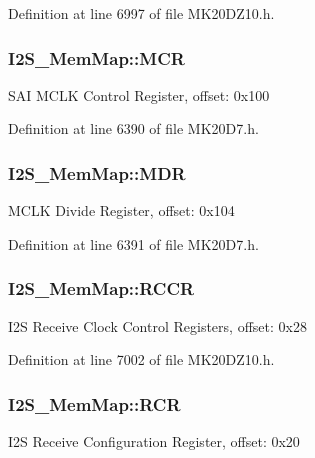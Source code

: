Definition at line 6997 of file M\+K20\+D\+Z10.\+h.

\subsubsection[{\texorpdfstring{M\+CR}{MCR}}]{ I2\+S\+\_\+\+Mem\+Map\+::\+M\+CR}\hypertarget{struct_i2_s___mem_map_ae0d902ef484de4b08fb15ac3bb335cc4}{}\label{struct_i2_s___mem_map_ae0d902ef484de4b08fb15ac3bb335cc4}
S\+AI M\+C\+LK Control Register, offset\+: 0x100 

Definition at line 6390 of file M\+K20\+D7.\+h.

\subsubsection[{\texorpdfstring{M\+DR}{MDR}}]{ I2\+S\+\_\+\+Mem\+Map\+::\+M\+DR}\hypertarget{struct_i2_s___mem_map_a2c12ce85b2f95cc5f4f4cb594e1df7e0}{}\label{struct_i2_s___mem_map_a2c12ce85b2f95cc5f4f4cb594e1df7e0}
M\+C\+LK Divide Register, offset\+: 0x104 

Definition at line 6391 of file M\+K20\+D7.\+h.

\subsubsection[{\texorpdfstring{R\+C\+CR}{RCCR}}]{ I2\+S\+\_\+\+Mem\+Map\+::\+R\+C\+CR}\hypertarget{struct_i2_s___mem_map_a0c4dddedd7f4d71d5bb3d67ec39e4dc1}{}\label{struct_i2_s___mem_map_a0c4dddedd7f4d71d5bb3d67ec39e4dc1}
I2S Receive Clock Control Registers, offset\+: 0x28 

Definition at line 7002 of file M\+K20\+D\+Z10.\+h.

\subsubsection[{\texorpdfstring{R\+CR}{RCR}}]{ I2\+S\+\_\+\+Mem\+Map\+::\+R\+CR}\hypertarget{struct_i2_s___mem_map_a93eda7701dd0f53e686adffc5182e8de}{}\label{struct_i2_s___mem_map_a93eda7701dd0f53e686adffc5182e8de}
I2S Receive Configuration Register, offset\+: 0x20 

